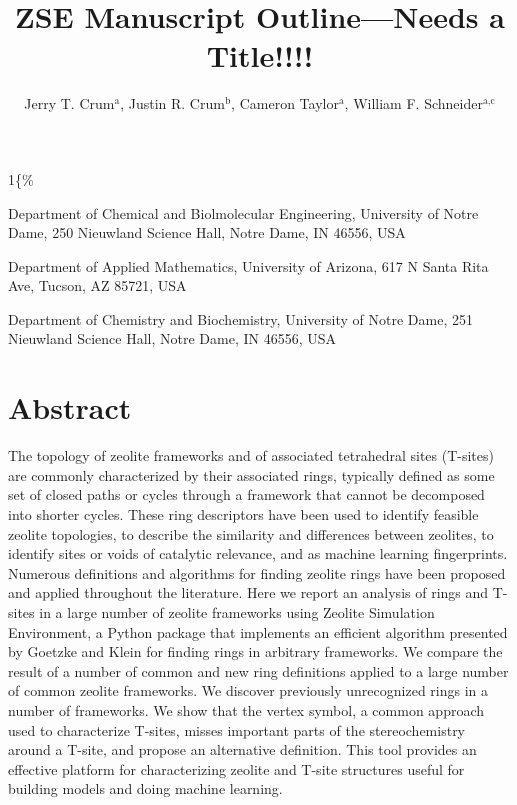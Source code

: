 \documentclass[11pt]{article}
\author{Jerry T. Crum\(^{\text{a}}\), Justin R. Crum\(^{\text{b}}\), Cameron Taylor\(^{\text{a}}\), William F. Schneider\(^{\text{a,c}}\)}
\date{}
\title{ZSE Manuscript Outline---Needs a Title!!!!}
\begin{document}
\begin{OPTIONS}
\def\udesoftecoverride\#1\mainmatter\{\%
  \AfterEndPreamble{#1\mainmatter}
\end{OPTIONS}

\maketitle

\begin{asparaenum}[\expandafter\textsuperscript a ]
\item Department of Chemical and Biolmolecular Engineering, University of Notre Dame, 250 Nieuwland Science Hall, Notre Dame, IN 46556, USA \\
\item Department of Applied Mathematics, University of Arizona, 617 N Santa Rita Ave, Tucson, AZ 85721, USA\\
\item Department of Chemistry and Biochemistry, University of Notre Dame, 251 Nieuwland Science Hall, Notre Dame, IN 46556, USA
\end{asparaenum}

\newpage
\section{Abstract}
\label{sec:orgb67b8b5}
The topology of zeolite frameworks and of associated tetrahedral sites (T-sites) are commonly characterized by their associated rings, typically defined as some set of closed paths or cycles through a framework that cannot be decomposed into shorter cycles. These ring descriptors have been used to identify feasible zeolite topologies, to describe the similarity and differences between zeolites, to identify sites or voids of catalytic relevance, and as machine learning fingerprints. Numerous definitions and algorithms for finding zeolite rings have been proposed and applied throughout the literature. Here we report an analysis of rings and T-sites in a large number of zeolite frameworks using Zeolite Simulation Environment, a Python package that implements an efficient algorithm presented by Goetzke and Klein for finding rings in arbitrary frameworks. We compare the result of a number of common and new ring definitions applied to a large number of common zeolite frameworks. We discover previously unrecognized rings in a number of frameworks. We show that the vertex symbol, a common approach used to characterize T-sites, misses important parts of the stereochemistry around a T-site, and propose an alternative definition. This tool provides an effective platform for characterizing zeolite and T-site structures useful for building models and doing machine learning. 
\end{document}
